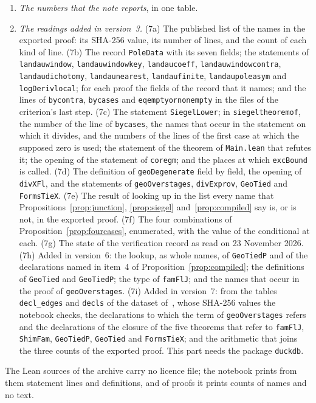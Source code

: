 \documentclass[11pt]{article}
\theoremstyle{definition}
\theoremstyle{remark}
\DeclareRobustCommand{\lean}[1]{{\renewcommand{\_}{\textunderscore\allowbreak}\texttt{#1}}}
\begin{document}
\begin{enumerate}[leftmargin=2em,itemsep=1pt]
\item \emph{The numbers that the note reports}, in one table.
\item \emph{The readings added in version~3.} (7a) The published list of the names in the exported proof: its SHA-256 value, its number of lines, and the count of each kind of line. (7b) The record \lean{PoleData} with its seven fields; the statements of \lean{landau\_window}, \lean{landau\_window\_key}, \lean{landau\_coeff}, \lean{landau\_window\_contra}, \lean{landau\_dichotomy}, \lean{landau\_nearest}, \lean{landau\_finite}, \lean{landau\_pole\_asym} and \lean{logDeriv\_local}; for each proof the fields of the record that it names; and the lines of \lean{by\_contra}, \lean{by\_cases} and \lean{eq\_empty\_or\_nonempty} in the files of the criterion's last step. (7c) The statement \lean{SiegelLower}; in \lean{siegel\_theorem\_of}, the number of the line of \lean{by\_cases}, the names that occur in the statement on which it divides, and the numbers of the lines of the first case at which the supposed zero is used; the statement of the theorem of \lean{Main.lean} that refutes it; the opening of the statement of \lean{core\_gm}; and the places at which \lean{excBound} is called. (7d) The definition of \lean{geoDegenerate} field by field, the opening of \lean{divXFl}, and the statements of \lean{geoOver\_stages}, \lean{divEx\_prov}, \lean{GeoTied} and \lean{FormsTieX}. (7e) The result of looking up in the list every name that Propositions~\ref{prop:junction}, \ref{prop:siegel} and~\ref{prop:compiled} say is, or is not, in the exported proof. (7f) The four combinations of Proposition~\ref{prop:fourcases}, enumerated, with the value of the conditional at each. (7g) The state of the verification record as read on 23 November 2026. (7h) Added in version~6: the lookup, as whole names, of \lean{GeoTiedP} and of the declarations named in item~4 of Proposition~\ref{prop:compiled}; the definitions of \lean{GeoTied} and \lean{GeoTiedP}; the type of \lean{famFlJ}; and the names that occur in the proof of \lean{geoOver\_stages}. (7i) Added in version~7: from the tables \nolinkurl{decl_edges} and \nolinkurl{decls} of the dataset of~\citet{shore}, whose SHA-256 values the notebook checks, the declarations to which the term of \lean{geoOver\_stages} refers and the declarations of the closure of the five theorems that refer to \lean{famFlJ}, \lean{ShimFam}, \lean{GeoTiedP}, \lean{GeoTied} and \lean{FormsTieX}; and the arithmetic that joins the three counts of the exported proof. This part needs the package \nolinkurl{duckdb}.
\end{enumerate}
The Lean sources of the archive carry no licence file; the notebook prints from them statement lines and definitions, and of proofs it prints counts of names and no text.
\end{document}
